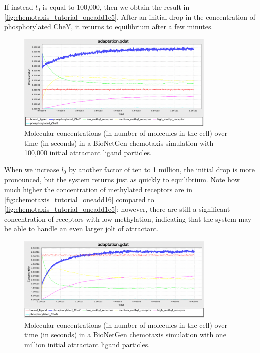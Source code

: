 If instead $l_0$ is equal to 100,000, then we obtain the result in \autoref{fig:chemotaxis_tutorial_oneadd1e5}. After an initial drop in the concentration of phosphorylated CheY, it returns to equilibrium after a few minutes.

\begin{figure}[h]
\centering
\mySfFamily
\includegraphics[width = 0.85\textwidth]{../images/chemotaxis_tutorial_oneadd1e5.png}
\caption{Molecular concentrations (in number of molecules in the cell) over time (in seconds) in a BioNetGen chemotaxis simulation with 100,000 initial attractant ligand particles.}
\label{fig:chemotaxis_tutorial_oneadd1e5}
\end{figure}


When we increase $l_0$ by another factor of ten to 1 million, the initial drop is more pronounced, but the system returns just as quickly to equilibrium. Note how much higher the concentration of methylated receptors are in \autoref{fig:chemotaxis_tutorial_oneadd16} compared to \autoref{fig:chemotaxis_tutorial_oneadd1e5}; however, there are still a significant concentration of receptors with low methylation, indicating that the system may be able to handle an even larger jolt of attractant.\\

\begin{figure}[h]
\centering
\mySfFamily
\includegraphics[width = 0.85\textwidth]{../images/chemotaxis_tutorial_oneadd1e6.png}
\caption{Molecular concentrations (in number of molecules in the cell) over time (in seconds) in a BioNetGen chemotaxis simulation with one million initial attractant ligand particles.}
\label{fig:chemotaxis_tutorial_oneadd16}
\end{figure}

